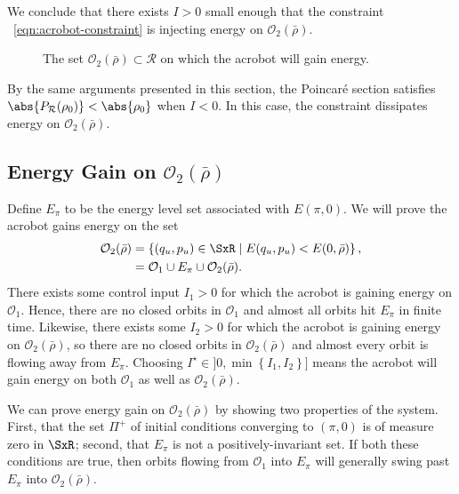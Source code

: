 We conclude that there exists \(I > 0\) small enough that the constraint
~\eqref{eqn:acrobot-constraint} is injecting energy on \(\mathcal{O}_2(\bar{\rho})\).

\begin{figure}
    \centering
    
    \caption{The set \(\mathcal{O}_2(\bar{\rho}) \subset \mathcal{R}\) on which the acrobot will gain energy.
    }
    \label{fig:acrobot-little-omega}
\end{figure}

By the same arguments presented in this section, the Poincar\'{e} section
satisfies \(\abs{P_\mathcal{R}(\rho_0)} < \abs{\rho_0}\) when \(I < 0\).
In this case, the constraint dissipates energy on \(\mathcal{O}_2(\bar{\rho})\).

\subsection{Energy Gain on \(\mathcal{O}_2(\bar{\rho})\)}
Define \(E_\pi\) to be the energy level set associated with \(E(\pi,0)\).
We will prove the acrobot gains energy on the set 
\begin{align*}
    \mathcal{O}_2(\bar{\rho}) &= \left\{(q_u,p_u) \in \SxR
    \mid E(q_u,p_u) < E(0,\bar{\rho}) \right\}
    ,\\
    &= \mathcal{O}_1 \cup E_\pi \cup \mathcal{O}_2(\bar{\rho})
    .
\end{align*}
There exists some control input \(I_1 > 0\) for which the acrobot is gaining
energy on \(\mathcal{O}_1\). 
Hence, there are no closed orbits in \(\mathcal{O}_1\) and almost all orbits 
hit \(E_\pi\) in finite time.
Likewise, there exists some \(I_2 > 0\) for which the acrobot is gaining energy
on \(\mathcal{O}_2(\bar{\rho})\), so there are no closed orbits in \(\mathcal{O}_2(\bar{\rho})\) and almost every
orbit is flowing away from \(E_\pi\).
Choosing \(I^\star \in ]0,\min\left\{I_1,I_2\right\}]\) means the acrobot will gain energy on
both \(\mathcal{O}_1\) as well as \(\mathcal{O}_2(\bar{\rho})\).

We can prove energy gain on \(\mathcal{O}_2(\bar{\rho})\) by showing two properties of the system.
First, that the set \(\Pi^+\) of initial conditions converging to  \((\pi,0)\)
is of measure zero in \(\SxR\);
second, that \(E_\pi\) is not a positively-invariant set.
If both these conditions are true, then orbits flowing from \(\mathcal{O}_1\) into
\(E_\pi\) will generally swing past \(E_\pi\) into \(\mathcal{O}_2(\bar{\rho})\).

